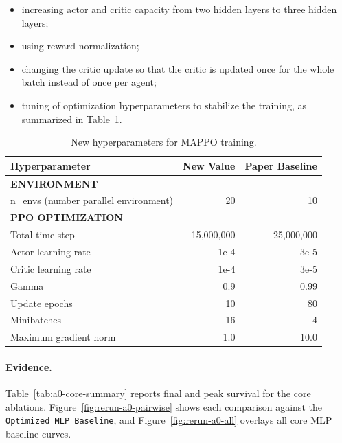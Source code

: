 \begin{itemize}
  \item increasing actor and critic capacity from two hidden layers to three
  hidden layers;
  \item using reward normalization;
  \item changing the critic update so that the critic is updated once for the
  whole batch instead of once per agent;
  \item tuning of optimization hyperparameters to stabilize the training, as summarized in Table~\ref{tab:new-hyperparameters}.
\end{itemize}

\begin{table}[H]
  \centering
  \small
  \caption{New hyperparameters for MAPPO training.}
  \label{tab:new-hyperparameters}
  \begin{tabular}{lrr}
    \toprule
    Hyperparameter & New Value & Paper Baseline \\
    \midrule
    \textbf{ENVIRONMENT} & & \\
    n\_envs (number parallel environment) & 20 & 10 \\
    \midrule
    \textbf{PPO OPTIMIZATION} & & \\
    Total time step & 15,000,000 & 25,000,000 \\
    Actor learning rate & 1e-4 & 3e-5 \\
    Critic learning rate & 1e-4 & 3e-5 \\
    Gamma & 0.9 & 0.99 \\
    Update epochs & 10 & 80 \\
    Minibatches & 16 & 4 \\
    Maximum gradient norm & 1.0 & 10.0 \\
    \bottomrule
  \end{tabular}
\end{table}

\paragraph{Evidence.}
Table~\ref{tab:a0-core-summary} reports final and peak survival for the core
ablations. Figure~\ref{fig:rerun-a0-pairwise} shows each comparison against the
\texttt{Optimized MLP Baseline}, and Figure~\ref{fig:rerun-a0-all} overlays all
core MLP baseline curves.


